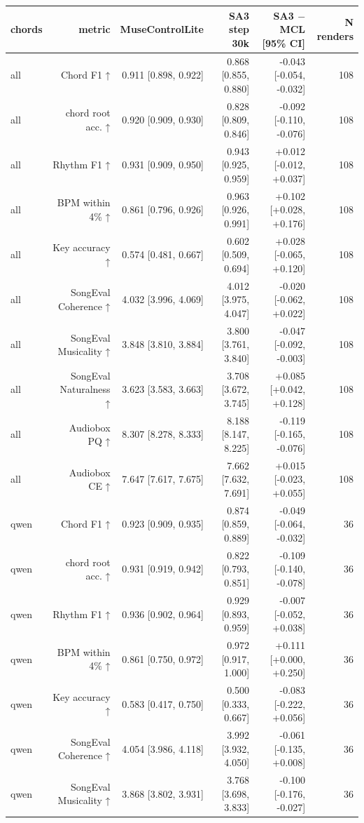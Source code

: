 \begin{table}[t]
\centering
\small
\begin{tabular}{lrrrrr}
\toprule
chords & metric & MuseControlLite & SA3 step 30k & SA3 $-$ MCL [95\% CI] & N renders \\
\midrule
all & Chord F1 ↑ & 0.911 [0.898, 0.922] & 0.868 [0.855, 0.880] & -0.043 [-0.054, -0.032] & 108 \\
all & chord root acc. ↑ & 0.920 [0.909, 0.930] & 0.828 [0.809, 0.846] & -0.092 [-0.110, -0.076] & 108 \\
all & Rhythm F1 ↑ & 0.931 [0.909, 0.950] & 0.943 [0.925, 0.959] & +0.012 [-0.012, +0.037] & 108 \\
all & BPM within 4\% ↑ & 0.861 [0.796, 0.926] & 0.963 [0.926, 0.991] & +0.102 [+0.028, +0.176] & 108 \\
all & Key accuracy ↑ & 0.574 [0.481, 0.667] & 0.602 [0.509, 0.694] & +0.028 [-0.065, +0.120] & 108 \\
all & SongEval Coherence ↑ & 4.032 [3.996, 4.069] & 4.012 [3.975, 4.047] & -0.020 [-0.062, +0.022] & 108 \\
all & SongEval Musicality ↑ & 3.848 [3.810, 3.884] & 3.800 [3.761, 3.840] & -0.047 [-0.092, -0.003] & 108 \\
all & SongEval Naturalness ↑ & 3.623 [3.583, 3.663] & 3.708 [3.672, 3.745] & +0.085 [+0.042, +0.128] & 108 \\
all & Audiobox PQ ↑ & 8.307 [8.278, 8.333] & 8.188 [8.147, 8.225] & -0.119 [-0.165, -0.076] & 108 \\
all & Audiobox CE ↑ & 7.647 [7.617, 7.675] & 7.662 [7.632, 7.691] & +0.015 [-0.023, +0.055] & 108 \\
qwen & Chord F1 ↑ & 0.923 [0.909, 0.935] & 0.874 [0.859, 0.889] & -0.049 [-0.064, -0.032] & 36 \\
qwen & chord root acc. ↑ & 0.931 [0.919, 0.942] & 0.822 [0.793, 0.851] & -0.109 [-0.140, -0.078] & 36 \\
qwen & Rhythm F1 ↑ & 0.936 [0.902, 0.964] & 0.929 [0.893, 0.959] & -0.007 [-0.052, +0.038] & 36 \\
qwen & BPM within 4\% ↑ & 0.861 [0.750, 0.972] & 0.972 [0.917, 1.000] & +0.111 [+0.000, +0.250] & 36 \\
qwen & Key accuracy ↑ & 0.583 [0.417, 0.750] & 0.500 [0.333, 0.667] & -0.083 [-0.222, +0.056] & 36 \\
qwen & SongEval Coherence ↑ & 4.054 [3.986, 4.118] & 3.992 [3.932, 4.050] & -0.061 [-0.135, +0.008] & 36 \\
qwen & SongEval Musicality ↑ & 3.868 [3.802, 3.931] & 3.768 [3.698, 3.833] & -0.100 [-0.176, -0.027] & 36 \\

\end{tabular}
\end{table}
